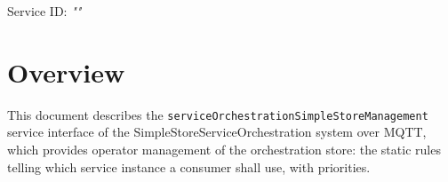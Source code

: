 \documentclass[a4paper]{arrowhead}
\begin{document}
\sloppy

\ArrowheadSetup

\begin{center}
  \vspace*{1cm}
  \huge{\arrowtitle}

  \vspace*{0.2cm}
  \LARGE{\arrowtype}
  \vspace*{1cm}

  \Large{Service ID: \textit{"\arrowid"}}

  \vspace*{\fill}


  \vspace*{1cm}
  \vspace*{\fill}

  \begin{abstract}
    This document describes the MQTT protocol with TLS payload security and JSON payload encoding variant of the \texttt{service\allowbreak{}Orchestration\allowbreak{}Simple\allowbreak{}Store\allowbreak{}Management} service of the SimpleStoreServiceOrchestration system.
  \end{abstract}

  \vspace*{1cm}
\end{center}

\newpage

\tableofcontents
\newpage

\section{Overview}
\label{sec:overview}

This document describes the \texttt{service\allowbreak{}Orchestration\allowbreak{}Simple\allowbreak{}Store\allowbreak{}Management} service interface of the SimpleStoreServiceOrchestration system over MQTT, which provides operator management of the orchestration store: the static rules telling which service instance a consumer shall use, with priorities.
\end{document}
